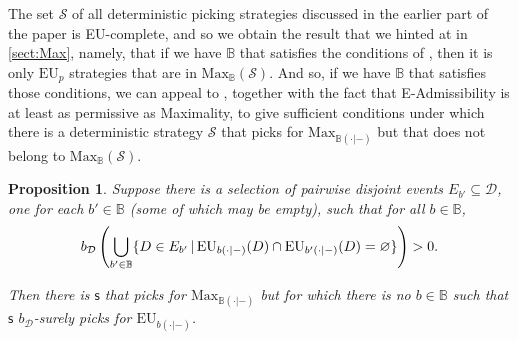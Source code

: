 \documentclass[a4paper]{article}
\newtheorem{proposition}[theorem]{Proposition}
\renewcommand\P{\mathbb{P}} %
\newcommand\Exp{\mathsf{Exp}}
\newcommand\EU{\mathrm{EU}}
\newcommand\U{\mathfrak{U}} %
\newcommand\Maximality{\mathrm{Max}}
\newcommand{\Decs}{\mathcal{D}}
\renewcommand\S{\mathcal{S}}
\newcommand\s{\mathsf{s}}
\newcommand{\n}{\mathsf{n}}
\newcommand{\IB}{\mathbb{B}}
\newcommand{\IP}{\P}
\newcommand{\todoold}[2][]{\todo[backgroundcolor=white,bordercolor=orange!10,linecolor=gray!10, #1,caption={},textcolor=gray]{Pre-rev: #2}}
\newcommand{\todooldinfo}[2][]{\todoold[#1]{#2}}
\newcommand\SetDelimiter[1][]{
	\nonscript\,#1\vert \allowbreak \nonscript\,\mathopen{}}
\providecommand\given{\SetDelimiter}
\renewcommand{\emptyset}{\varnothing}
\newenvironment{CCM rewritten}
{\begingroup\color{blue}} %
{\endgroup}              %
\begin{document}
	
	

	

The set $\S$ of all deterministic picking strategies discussed in the earlier part of the paper is EU-complete, and so we obtain the result that we hinted at in \cref{sect:Max}, namely, that if we have $\IB$ that satisfies the conditions of , then it is only $\EU_p$ strategies that are in $\Maximality_\IB(\S)$. And so, if we have $\IB$ that satisfies those conditions, we can appeal to , together with the fact that E-Admissibility is at least as permissive as Maximality, to give sufficient conditions under which there is a deterministic strategy $\S$ that picks for $\Maximality_{\IB(\cdot|-)}$ but that does not belong to $\Maximality_\IB(\S)$.

\begin{proposition}\label{thm:max-existsimpermissible[dep]}
Suppose there is a selection of pairwise disjoint events $E_{b'}\subseteq\Decs$, one for each $b'\in\IB$ (some of which may be empty),  such that for all $b\in\IB$, $$b_\Decs\left(\bigcup_{b'\in\IB}\{D\in E_{b'}\given \EU_{b(\cdot|-)}(D)\cap \EU_{b'(\cdot|-)}(D)=\emptyset\}\right)>0.$$

Then there is $\s$ that picks for $\Maximality_{\IB(\cdot|-)}$ but for which there is no $b\in\IB$ such that $\s$  $b_\Decs$-surely picks for $\EU_{b(\cdot|-)}$. 
\end{proposition}
\end{document}
